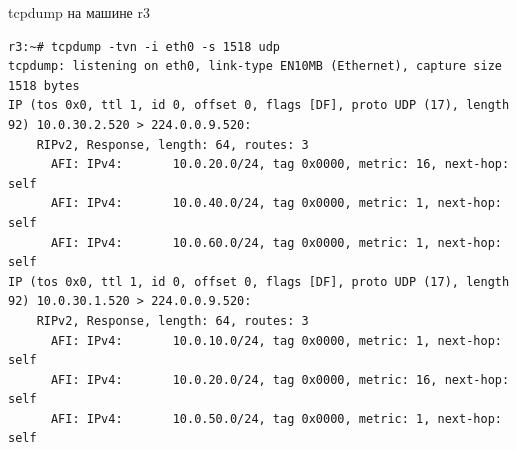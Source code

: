 \documentclass[a4paper,12pt]{article}
\begin{document}
tcpdump на машине r3

\begin{Verbatim}
r3:~# tcpdump -tvn -i eth0 -s 1518 udp
tcpdump: listening on eth0, link-type EN10MB (Ethernet), capture size 1518 bytes
IP (tos 0x0, ttl 1, id 0, offset 0, flags [DF], proto UDP (17), length 92) 10.0.30.2.520 > 224.0.0.9.520: 
	RIPv2, Response, length: 64, routes: 3
	  AFI: IPv4:       10.0.20.0/24, tag 0x0000, metric: 16, next-hop: self
	  AFI: IPv4:       10.0.40.0/24, tag 0x0000, metric: 1, next-hop: self
	  AFI: IPv4:       10.0.60.0/24, tag 0x0000, metric: 1, next-hop: self
IP (tos 0x0, ttl 1, id 0, offset 0, flags [DF], proto UDP (17), length 92) 10.0.30.1.520 > 224.0.0.9.520: 
	RIPv2, Response, length: 64, routes: 3
	  AFI: IPv4:       10.0.10.0/24, tag 0x0000, metric: 1, next-hop: self
	  AFI: IPv4:       10.0.20.0/24, tag 0x0000, metric: 16, next-hop: self
	  AFI: IPv4:       10.0.50.0/24, tag 0x0000, metric: 1, next-hop: self
\end{Verbatim}
\end{document}
